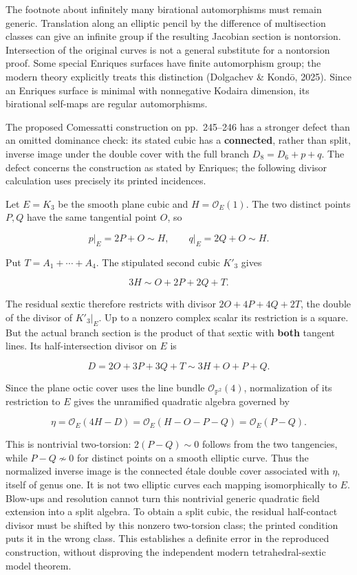 The footnote about infinitely many birational automorphisms must remain generic. Translation along an elliptic pencil by the difference of multisection classes can give an infinite group if the resulting Jacobian section is nontorsion. Intersection of the original curves is not a general substitute for a nontorsion proof. Some special Enriques surfaces have finite automorphism group; the modern theory explicitly treats this distinction (Dolgachev \& Kond\=o, 2025). Since an Enriques surface is minimal with nonnegative Kodaira dimension, its birational self-maps are regular automorphisms.

The proposed Comessatti construction on pp.~245--246 has a stronger defect than an omitted dominance check: its stated cubic has a \textbf{connected}, rather than split, inverse image under the double cover with the full branch \(D_8=D_6+p+q\). The defect concerns the construction as stated by Enriques; the following divisor calculation uses precisely its printed incidences.

Let \(E=K_3\) be the smooth plane cubic and \(H=\mathcal O_E(1)\). The two distinct points \(P,Q\) have the same tangential point \(O\), so

\[
 p\vert _E=2P+O\sim H,\qquad q\vert _E=2Q+O\sim H.
\]

Put \(T=A_1+\cdots+A_4\). The stipulated second cubic \(K'_3\) gives

\[
3H\sim O+2P+2Q+T.
\]

The residual sextic therefore restricts with divisor \(2O+4P+4Q+2T\), the double of the divisor of \(K'_3\vert _E\). Up to a nonzero complex scalar its restriction is a square. But the actual branch section is the product of that sextic with \textbf{both} tangent lines. Its half-intersection divisor on \(E\) is

\[
D=2O+3P+3Q+T\sim3H+O+P+Q.
\]

Since the plane octic cover uses the line bundle \(\mathcal O_{\mathbb P^2}(4)\), normalization of its restriction to \(E\) gives the unramified quadratic algebra governed by

\[
\eta=\mathcal O_E(4H-D)
      =\mathcal O_E(H-O-P-Q)
      =\mathcal O_E(P-Q).
\]

This is nontrivial two-torsion: \(2(P-Q)\sim0\) follows from the two tangencies, while \(P-Q\not\sim0\) for distinct points on a smooth elliptic curve. Thus the normalized inverse image is the connected étale double cover associated with \(\eta\), itself of genus one. It is not two elliptic curves each mapping isomorphically to \(E\). Blow-ups and resolution cannot turn this nontrivial generic quadratic field extension into a split algebra. To obtain a split cubic, the residual half-contact divisor must be shifted by this nonzero two-torsion class; the printed condition puts it in the wrong class. This establishes a definite error in the reproduced construction, without disproving the independent modern tetrahedral-sextic model theorem.

